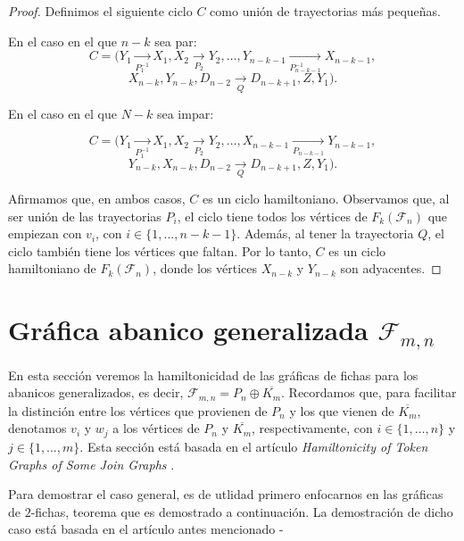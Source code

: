 \begin{proof}
    Definimos el siguiente ciclo $C$ como uni\'on de trayectorias m\'as
    peque\~{n}as.
    
    En el caso en el que $n-k$ sea par:
     \[       
        C =(Y_1 \xrightarrow[P_1^{-1}]{} X_1, X_2 \xrightarrow[P_2]{} Y_2, \dots,
        Y_{n-k-1} \xrightarrow[P_{n-k-1}^{-1}]{} X_{n-k-1},\]
        \[ X_{n-k}, Y_{n-k},
        D_{n-2} \xrightarrow[Q]{} D_{n-k+1}, Z, Y_1).
    \]
    
    En el caso en el que $N-k$ sea impar:
    
    \[
        C = (Y_1 \xrightarrow[P_1^{-1}]{} X_1, X_2 \xrightarrow[P_2]{} Y_2, \dots,
        X_{n-k-1} \xrightarrow[P_{n-k-1}]{} Y_{n-k-1},\]
        \[Y_{n-k}, X_{n-k}, D_{n-2} \xrightarrow[Q]{} D_{n-k+1}, Z, Y_1). \]
    
    Afirmamos que, en ambos casos, $C$ es un ciclo hamiltoniano. Observamos que,
    al ser uni\'on de las trayectorias $P_i$, el ciclo tiene todos los
    v\'ertices de $F_k(\mathcal{F}_n)$ que empiezan con $v_i$, con $i \in \{1,
    \dots, n-k-1\}$. Adem\'as, al tener la trayectoria $Q$, el ciclo tambi\'en
    tiene los v\'ertices que faltan. Por lo tanto, $C$ es un ciclo hamiltoniano
    de $F_k(\mathcal{F}_n)$, donde los v\'ertices $X_{n-k}$ y $Y_{n-k}$ son
    adyacentes. 

\end{proof}

\section{Gr\'afica abanico generalizada
\texorpdfstring{$\mathcal{F}_{m,n}$}{Fmn}}%
\label{sec:GeneralFan}

En esta secci\'on veremos la hamiltonicidad de las gr\'aficas de fichas para los
abanicos generalizados, es decir, $\mathcal{F}_{m,n}=P_n \oplus \overline{K_m}$.
Recordamos que, para facilitar la distinci\'on entre los v\'ertices que
provienen de $P_n$ y los que vienen de $\overline{K_m}$, denotamos $v_i$ y $w_j$
a los v\'ertices de $P_n$ y $\overline{K_m}$, respectivamente, con $i \in \{1,
\dots, n\}$ y $j \in \{1, \dots, m\}$. Esta secci\'on est\'a basada en el
art\'iculo \textit{Hamiltonicity of Token Graphs of Some Join Graphs}
\cite{adameHamilt}.

Para demostrar el caso general, es de utlidad primero enfocarnos en las
gr\'aficas de $2$-fichas, teorema que es demostrado a continuaci\'on. La
demostraci\'on de dicho caso est\'a basada en el art\'iculo antes mencionado
\cite{adameHamilt}-

